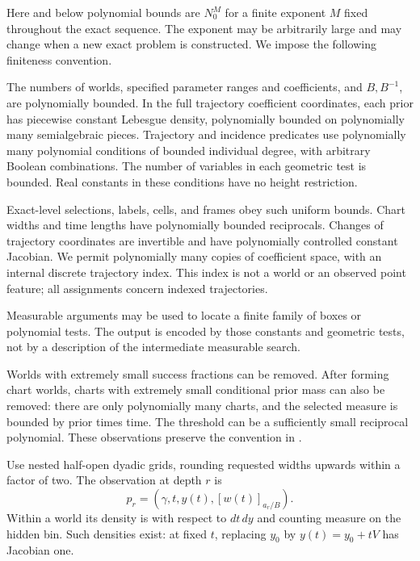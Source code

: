 Here and below polynomial bounds are \(N_0^M\) for a finite exponent
\(M\) fixed throughout the exact sequence.  The exponent may be
arbitrarily large and may change when a new exact problem is constructed.
We impose the following finiteness convention.

\begin{definition}\label{a01:tempered}
The numbers of worlds, specified parameter ranges and coefficients,
and \(B,B^{-1}\), are polynomially bounded.  In the full trajectory
coefficient coordinates, each prior has piecewise constant Lebesgue
density, polynomially bounded on polynomially many semialgebraic
pieces.  Trajectory and incidence predicates use polynomially many
polynomial conditions of bounded individual degree, with arbitrary
Boolean combinations.  The number of variables in each geometric
test is bounded.  Real constants in these conditions have no height
restriction.

Exact-level selections, labels, cells, and frames obey such uniform
bounds.  Chart widths and time lengths have polynomially bounded
reciprocals.  Changes of trajectory coordinates are invertible and
have polynomially controlled constant Jacobian.  We permit
polynomially many copies of coefficient space, with an internal
discrete trajectory index.  This index is not a world or an observed
point feature; all assignments concern indexed trajectories.

Measurable arguments may be used to locate a finite family of boxes
or polynomial tests.  The output is encoded by those constants and
geometric tests, not by a description of the intermediate measurable
search.
\end{definition}

Worlds with extremely small success fractions can be removed.
After forming chart worlds, charts with extremely small conditional
prior mass can also be removed: there are only polynomially many
charts, and the selected measure is bounded by prior times time.
The threshold can be a sufficiently small reciprocal polynomial.
These observations preserve the convention in
.

Use nested half-open dyadic grids, rounding requested widths upwards
within a factor of two.  The observation at depth \(r\) is
\begin{equation}
 p_r=(\gamma,t,y(t),[w(t)]_{a_r/B}).
 \label{a01:observation}
\end{equation}
Within a world its density is with respect to \(dt\,dy\) and counting
measure on the hidden bin.  Such densities exist: at fixed \(t\),
replacing \(y_0\) by \(y(t)=y_0+tV\) has Jacobian one.

